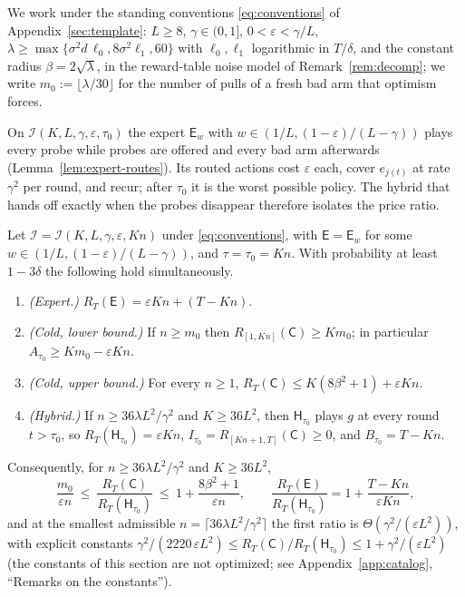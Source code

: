 \documentclass[anon]{alt2027} %
\newcommand{\eps}{\varepsilon}
\newcommand{\Cold}{\mathsf{C}}
\newcommand{\Exp}{\mathsf{E}}
\newcommand{\Hyb}{\mathsf{H}}
\begin{document}
We work under the standing conventions \eqref{eq:conventions} of
Appendix~\ref{sec:template}: $L\ge8$, $\gamma\in(0,1]$, $0<\eps<\gamma/L$,
$\lambda\ge\max\{\sigma^2d\,\ell_0,8\sigma^2\ell_1,60\}$ with $\ell_0,\ell_1$
logarithmic in $T/\delta$, and the constant radius $\beta=2\sqrt\lambda$, in
the reward-table noise model of Remark~\ref{rem:decomp}; we write
$m_0:=\lfloor\lambda/30\rfloor$ for the number of pulls of a fresh bad arm
that optimism forces.

On $\mathcal I(K,L,\gamma,\eps,\tau_0)$ the expert $\Exp_w$ with
$w\in(1/L,(1-\eps)/(L-\gamma))$ plays every probe while probes are offered and
every bad arm afterwards (Lemma~\ref{lem:expert-routes}). Its routed actions
cost $\eps$ each, cover $e_{j(t)}$ at rate $\gamma^2$ per round, and recur; after
$\tau_0$ it is the worst possible policy. The hybrid that hands off exactly
when the probes disappear therefore isolates the price ratio.

\begin{theorem}
\label{thm:price}
Let $\mathcal I=\mathcal I(K,L,\gamma,\eps,Kn)$ under \eqref{eq:conventions}, with
$\Exp=\Exp_w$ for some $w\in(1/L,(1-\eps)/(L-\gamma))$, and $\tau=\tau_0=Kn$. With
probability at least $1-3\delta$ the following hold simultaneously.
\begin{enumerate}[itemsep=1pt,topsep=1pt,leftmargin=*]
\item[(i)] \emph{(Expert.)} $R_T(\Exp)=\eps Kn+(T-Kn)$.
\item[(ii)] \emph{(Cold, lower bound.)} If $n\ge m_0$ then
$R_{[1,Kn]}(\Cold)\ge Km_0$; in particular $A_{\tau_0}\ge Km_0-\eps Kn$.
\item[(iii)] \emph{(Cold, upper bound.)} For every $n\ge1$, $R_T(\Cold)\le K(8\beta^2+1)+\eps Kn$.
\item[(iv)] \emph{(Hybrid.)} If $n\ge36\lambda L^2/\gamma^2$ and $K\ge36L^2$, then
$\Hyb_{\tau_0}$ plays $g$ at every round $t>\tau_0$, so
$R_T(\Hyb_{\tau_0})=\eps Kn$, $I_{\tau_0}=R_{[Kn+1,T]}(\Cold)\ge0$, and
$B_{\tau_0}=T-Kn$.
\end{enumerate}
Consequently, for $n\ge36\lambda L^2/\gamma^2$ and $K\ge36L^2$,
\begin{equation}
\label{eq:price-ratio}
\frac{m_0}{\eps n}\ \le\ \frac{R_T(\Cold)}{R_T(\Hyb_{\tau_0})}\ \le\ 1+\frac{8\beta^2+1}{\eps n},
\qquad
\frac{R_T(\Exp)}{R_T(\Hyb_{\tau_0})}=1+\frac{T-Kn}{\eps Kn},
\end{equation}
and at the smallest admissible $n=\lceil36\lambda L^2/\gamma^2\rceil$ the first
ratio is $\Theta(\gamma^2/(\eps L^2))$, with explicit constants
$\gamma^2/(2220\,\eps L^2)\le R_T(\Cold)/R_T(\Hyb_{\tau_0})\le1+\gamma^2/(\eps L^2)$
(the constants of this section are not optimized; see
Appendix~\ref{app:catalog}, ``Remarks on the constants'').
\end{theorem}
\end{document}
